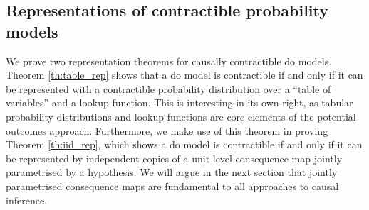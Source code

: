 






\subsection{Representations of contractible probability models}

We prove two representation theorems for causally contractible do models. Theorem \ref{th:table_rep} shows that a do model is contractible if and only if it can be represented with a contractible probability distribution over a ``table of variables'' and a lookup function. This is interesting in its own right, as tabular probability distributions and lookup functions are core elements of the potential outcomes approach. Furthermore, we make use of this theorem in proving Theorem \ref{th:iid_rep}, which shows a do model is contractible if and only if it can be represented by independent copies of a unit level consequence map jointly parametrised by a hypothesis. We will argue in the next section that jointly parametrised consequence maps are fundamental to all approaches to causal inference.

